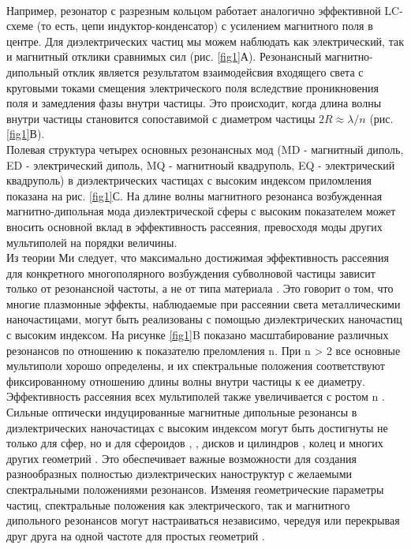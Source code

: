 \\
\hspace*{2mm}
Например, резонатор с разрезным кольцом \cite{pendry1999magnetism} работает аналогично эффективной LC-схеме (то есть, цепи индуктор-конденсатор) с усилением магнитного поля в центре. Для диэлектрических частиц мы можем наблюдать как электрический, так и магнитный отклики сравнимых сил (рис. \ref{fig1}А). Резонансный магнитно-дипольный отклик является результатом взаимодейсвия входящего света с круговыми токами смещения электрического поля вследствие проникновения поля и замедления фазы внутри частицы. Это происходит, когда длина волны внутри частицы становится сопоставимой с диаметром частицы $2R \approx \lambda/n$ (рис. \ref{fig1}В). 
\\
Полевая структура четырех основных резонансных мод (MD -  магнитный диполь, ED - электрический диполь, MQ - магнитноый квадруполь,  EQ - электрический квадруполь) в диэлектрических частицах с высоким индексом приломления показана на рис. \ref{fig1}С. На длине волны магнитного резонанса возбужденная магнитно-дипольная мода диэлектрической сферы с высоким показателем может вносить основной вклад в эффективность рассеяния, превосходя моды других мультиполей на порядки величины.
\\
\hspace*{2mm}
Из теории Ми следует, что максимально достижимая эффективность рассеяния для конкретного многополярного возбуждения субволновой частицы зависит только от резонансной частоты, а не от типа материала \cite{schuller2009general}. Это говорит о том, что многие плазмонные эффекты, наблюдаемые при рассеянии света металлическими наночастицами, могут быть реализованы с помощью диэлектрических наночастиц с высоким индексом. На рисунке \ref{fig1}B показано масштабирование различных резонансов по отношению к показателю преломления n. При n > 2 все основные мультиполи хорошо определены, и их спектральные положения соответствуют фиксированному отношению длины волны внутри частицы к ее диаметру. Эффективность рассеяния всех мультиполей также увеличивается с ростом n \cite{articleOptSi}.
\\
\hspace*{2mm}
Сильные оптически индуцированные магнитные дипольные резонансы в диэлектрических наночастицах с высоким индексом могут быть достигнуты не только для сфер, но и для сфероидов \cite{articleDirVi}, \cite{optScatShper}, дисков и цилиндров \cite{multLightScat}, колец \cite{contrMagnModes} и многих других геометрий \cite{nearInfrMR}. Это обеспечивает важные возможности для создания разнообразных полностью диэлектрических наноструктур с желаемыми спектральными положениями резонансов. Изменяя геометрические параметры частиц, спектральные положения как электрического, так и магнитного дипольного резонансов могут настраиваться независимо, чередуя или перекрывая друг друга на одной частоте для простых геометрий \cite{optScatDeilectrHightIndex}.


